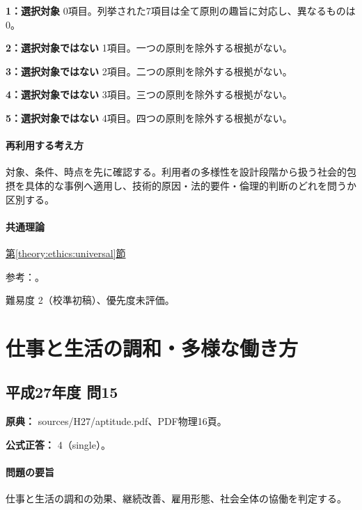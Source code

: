 \noindent\textbf{1：選択対象} 0項目。列挙された7項目は全て原則の趣旨に対応し、異なるものは0。\par

\noindent\textbf{2：選択対象ではない} 1項目。一つの原則を除外する根拠がない。\par

\noindent\textbf{3：選択対象ではない} 2項目。二つの原則を除外する根拠がない。\par

\noindent\textbf{4：選択対象ではない} 3項目。三つの原則を除外する根拠がない。\par

\noindent\textbf{5：選択対象ではない} 4項目。四つの原則を除外する根拠がない。\par

\paragraph{再利用する考え方} 対象、条件、時点を先に確認する。利用者の多様性を設計段階から扱う社会的包摂を具体的な事例へ適用し、技術的原因・法的要件・倫理的判断のどれを問うか区別する。

\paragraph{共通理論} \hyperref[theory:ethics:universal]{第\ref*{theory:ethics:universal}節}

\par 参考：\cite{ncsu_ud1997}。

\par 難易度 2（校準初稿）、優先度未評価。

\section{仕事と生活の調和・多様な働き方}

\subsection{平成27年度 問15}
\label{q:h27-reg-apt-15}

\noindent\textbf{原典：} sources/H27/aptitude.pdf、PDF物理16頁。

\textbf{公式正答：} 4（single）。

\paragraph{問題の要旨} 仕事と生活の調和の効果、継続改善、雇用形態、社会全体の協働を判定する。

